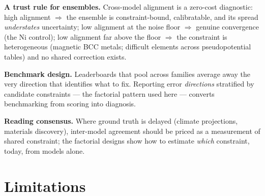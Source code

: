 \documentclass[11pt]{article}
\begin{document}
\textbf{A trust rule for ensembles.} Cross-model alignment is a zero-cost
diagnostic: high alignment $\Rightarrow$ the ensemble is constraint-bound,
calibratable, and its spread \emph{understates} uncertainty; low alignment at
the noise floor $\Rightarrow$ genuine convergence (the Ni control); low
alignment far above the floor $\Rightarrow$ the constraint is heterogeneous
(magnetic BCC metals; difficult elements across pseudopotential tables) and no
shared correction exists.

\textbf{Benchmark design.} Leaderboards that pool across families average away
the very direction that identifies what to fix. Reporting error
\emph{directions} stratified by candidate constraints --- the factorial
pattern used here --- converts benchmarking from scoring into diagnosis.

\textbf{Reading consensus.} Where ground truth is delayed (climate
projections, materials discovery), inter-model agreement should be priced as a
measurement of shared constraint; the factorial designs show how to estimate
\emph{which} constraint, today, from models alone.

\section{Limitations}
\label{sec:limits}
\end{document}
